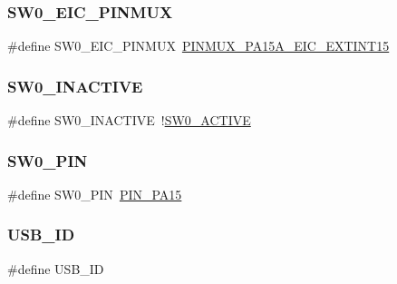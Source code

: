 \mbox{\label{group__samd21__xplained__pro__features__group_ga27bc87cdd4caabcd3160ae3a03f297c7}} 
\subsubsection{\texorpdfstring{SW0\_EIC\_PINMUX}{SW0\_EIC\_PINMUX}}
{\footnotesize\ttfamily \#define S\+W0\+\_\+\+E\+I\+C\+\_\+\+P\+I\+N\+M\+UX~\mbox{\hyperlink{pio_2samd21j18a_8h_aa82833fe8b0e407c256328205ffa03a7}{P\+I\+N\+M\+U\+X\+\_\+\+P\+A15\+A\+\_\+\+E\+I\+C\+\_\+\+E\+X\+T\+I\+N\+T15}}}

\mbox{\label{group__samd21__xplained__pro__features__group_ga74eeefc6abe579addaec6ac2bff4d080}} 
\subsubsection{\texorpdfstring{SW0\_INACTIVE}{SW0\_INACTIVE}}
{\footnotesize\ttfamily \#define S\+W0\+\_\+\+I\+N\+A\+C\+T\+I\+VE~!\mbox{\hyperlink{group__samd21__xplained__pro__features__group_gac534d0b05a26a80e6e8e83a049b80655}{S\+W0\+\_\+\+A\+C\+T\+I\+VE}}}

\mbox{\label{group__samd21__xplained__pro__features__group_ga1db7ea1df7a18b3749ee2eaaa2f2d0af}} 
\subsubsection{\texorpdfstring{SW0\_PIN}{SW0\_PIN}}
{\footnotesize\ttfamily \#define S\+W0\+\_\+\+P\+IN~\mbox{\hyperlink{pio_2samd21j18a_8h_abaad308f0408bf5d3f1fe558f3d26e5e}{P\+I\+N\+\_\+\+P\+A15}}}

\mbox{\label{group__samd21__xplained__pro__features__group_gade1af4ebab8628311834baeea376350c}} 
\subsubsection{\texorpdfstring{USB\_ID}{USB\_ID}}
{\footnotesize\ttfamily \#define U\+S\+B\+\_\+\+ID}

